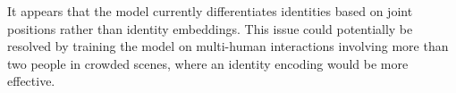 It appears that the model currently differentiates identities based on joint positions rather than identity embeddings. This issue could potentially be resolved by training the model on multi-human interactions involving more than two people in crowded scenes, where an identity encoding would be more effective.

